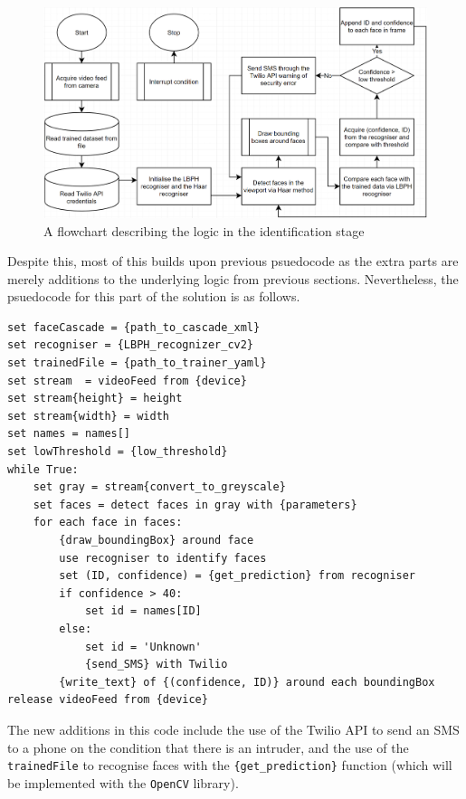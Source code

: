 \documentclass[9pt]{article}
\begin{document}
\begin{figure}[H]
	\centering
	\includegraphics[width=4.7in]{facialRecognitionIdentify.png}
	\caption{A flowchart describing the logic in the identification stage}\label{fig_flowRecognition}
\end{figure}
Despite this, most of this builds upon previous psuedocode as the extra parts are merely additions to the underlying logic from previous sections. Nevertheless, the psuedocode for this part of the solution is as follows.
\begin{lstlisting}
set faceCascade = {path_to_cascade_xml}
set recogniser = {LBPH_recognizer_cv2}
set trainedFile = {path_to_trainer_yaml} 
set stream 	= videoFeed from {device}
set stream{height} = height
set stream{width} = width
set names = names[]
set lowThreshold = {low_threshold}
while True:
	set gray = stream{convert_to_greyscale}
	set faces = detect faces in gray with {parameters}
	for each face in faces:
		{draw_boundingBox} around face
		use recogniser to identify faces
		set (ID, confidence) = {get_prediction} from recogniser
		if confidence > 40:
			set id = names[ID]
		else:
			set id = 'Unknown'
			{send_SMS} with Twilio
		{write_text} of {(confidence, ID)} around each boundingBox
release videoFeed from {device}
\end{lstlisting}
The new additions in this code include the use of the Twilio API to send an SMS to a phone on the condition that there is an intruder, and the use of the \texttt{trainedFile} to recognise faces with the \texttt{\{get\_prediction\}} function (which will be implemented with the \texttt{OpenCV} library).
\end{document}
